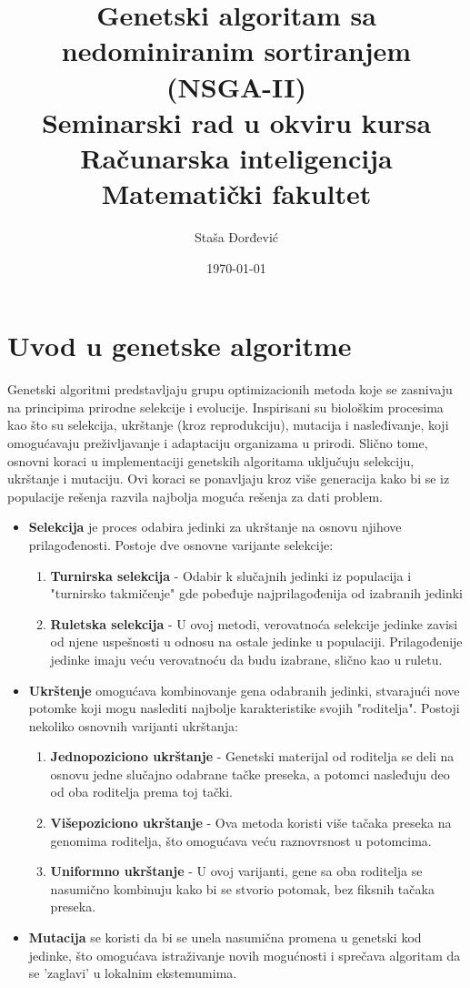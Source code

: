 \documentclass[12pt]{article}
\title{Genetski algoritam sa nedominiranim sortiranjem (NSGA-II) \\
\normalsize Seminarski rad u okviru kursa\\ Računarska inteligencija
\\Matematički fakultet}
\author{Staša Đorđević}
\date{\today}
\begin{document}
\maketitle

\tableofcontents

\section{Uvod u genetske algoritme}
Genetski algoritmi predstavljaju grupu optimizacionih metoda koje se zasnivaju na principima prirodne selekcije i evolucije. Inspirisani su biološkim procesima kao što su selekcija, ukrštanje (kroz reprodukciju), mutacija i nasleđivanje, koji omogućavaju preživljavanje i adaptaciju organizama u prirodi. Slično tome, osnovni koraci u implementaciji genetskih algoritama uključuju selekciju, ukrštanje i mutaciju. Ovi koraci se ponavljaju kroz više generacija kako bi se iz populacije rešenja razvila najbolja moguća rešenja za dati problem.

\begin{itemize}
    \item \textbf{Selekcija} je proces odabira jedinki za ukrštanje na osnovu njihove prilagođenosti. Postoje dve osnovne varijante selekcije:
    \begin{enumerate}
        \item \textbf{Turnirska selekcija} - Odabir k slučajnih jedinki iz populacija i "turnirsko takmičenje" gde pobeđuje najprilagođenija od izabranih jedinki
        \item \textbf{Ruletska selekcija} - U ovoj metodi, verovatnoća selekcije jedinke zavisi od njene uspešnosti u odnosu na ostale jedinke u populaciji. Prilagođenije jedinke imaju veću verovatnoću da budu izabrane, slično kao u ruletu.
    \end{enumerate}
    \item \textbf{Ukrštenje} omogućava kombinovanje gena odabranih jedinki, stvarajući nove potomke koji mogu naslediti najbolje karakteristike svojih "roditelja". Postoji nekoliko osnovnih varijanti ukrštanja:
    \begin{enumerate}
        \item \textbf{Jednopoziciono ukrštanje} - Genetski materijal od roditelja se deli na osnovu jedne slučajno odabrane tačke preseka, a potomci nasleđuju deo od oba roditelja prema toj tački.
        \item \textbf{Višepoziciono ukrštanje} - Ova metoda koristi više tačaka preseka na genomima roditelja, što omogućava veću raznovrsnost u potomcima.
        \item \textbf{Uniformno ukrštanje} - U ovoj varijanti, gene sa oba roditelja se nasumično kombinuju kako bi se stvorio potomak, bez fiksnih tačaka preseka.
    \end{enumerate}
    \item \textbf{Mutacija} se koristi da bi se unela nasumična promena u genetski kod jedinke, što omogućava istraživanje novih mogućnosti i sprečava algoritam da se 'zaglavi' u lokalnim ekstemumima.
\end{itemize}
\end{document}
